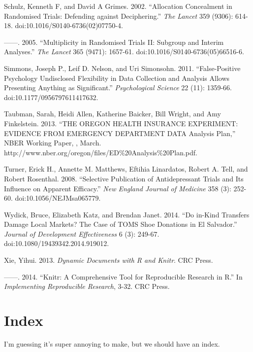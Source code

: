 \documentclass[12pt] {article}
\begin{document}
Schulz, Kenneth F, and David A Grimes. 2002. ``Allocation Concealment in
Randomised Trials: Defending against Deciphering.'' \emph{The Lancet}
359 (9306): 614-18. doi:10.1016/S0140-6736(02)07750-4.

------. 2005. ``Multiplicity in Randomised Trials II: Subgroup and
Interim Analyses.'' \emph{The Lancet} 365 (9471): 1657-61.
doi:10.1016/S0140-6736(05)66516-6.

Simmons, Joseph P., Leif D. Nelson, and Uri Simonsohn. 2011.
``False-Positive Psychology Undisclosed Flexibility in Data Collection
and Analysis Allows Presenting Anything as Significant.''
\emph{Psychological Science} 22 (11): 1359-66.
doi:10.1177/0956797611417632.

Taubman, Sarah, Heidi Allen, Katherine Baicker, Bill Wright, and Amy
Finkelstein. 2013. ``THE OREGON HEALTH INSURANCE EXPERIMENT: EVIDENCE
FROM EMERGENCY DEPARTMENT DATA Analysis Plan,'' NBER Working Paper, ,
March. http://www.nber.org/oregon/files/ED\%20Analysis\%20Plan.pdf.

Turner, Erick H., Annette M. Matthews, Eftihia Linardatos, Robert A.
Tell, and Robert Rosenthal. 2008. ``Selective Publication of
Antidepressant Trials and Its Influence on Apparent Efficacy.''
\emph{New England Journal of Medicine} 358 (3): 252-60.
doi:10.1056/NEJMsa065779.

Wydick, Bruce, Elizabeth Katz, and Brendan Janet. 2014. ``Do in-Kind
Transfers Damage Local Markets? The Case of TOMS Shoe Donations in El
Salvador.'' \emph{Journal of Development Effectiveness} 6 (3): 249-67.
doi:10.1080/19439342.2014.919012.

Xie, Yihui. 2013. \emph{Dynamic Documents with R and Knitr}. CRC Press.

------. 2014. ``Knitr: A Comprehensive Tool for Reproducible Research in
R.'' In \emph{Implementing Reproducible Research}, 3-32. CRC Press.

\section{Index}\label{index}

I'm guessing it's super annoying to make, but we should have an index.
\end{document}
